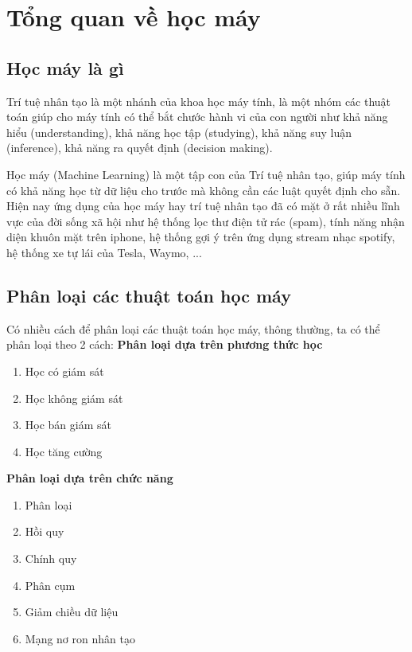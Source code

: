 \documentclass[../DoAn.tex]{subfiles}
\begin{document}
\section{Tổng quan về học máy}
\label{section:3.1}
\subsection{Học máy là gì}
Trí tuệ nhân tạo là một nhánh của khoa học máy tính, là một nhóm các thuật toán giúp cho máy tính có thể bắt chước hành vi của con người như khả năng hiểu (understanding), khả năng học tập (studying), khả năng suy luận (inference), khả năng ra quyết định (decision making). 

Học máy (Machine Learning) là một tập con của Trí tuệ nhân tạo, giúp máy tính có khả năng học từ dữ liệu cho trước mà không cần các luật quyết định cho sẵn. Hiện nay ứng dụng của học máy hay trí tuệ nhân tạo đã có mặt ở rất nhiều lĩnh vực của đời sống xã hội như hệ thống lọc thư điện tử rác (spam), tính năng nhận diện khuôn mặt trên iphone, hệ thống gợi ý trên ứng dụng stream nhạc spotify, hệ thống xe tự lái của Tesla, Waymo, ...
\subsection{Phân loại các thuật toán học máy}
Có nhiều cách để phân loại các thuật toán học máy, thông thường, ta có thể phân loại theo 2 cách:
\textbf{Phân loại dựa trên phương thức học}
\begin{enumerate}
    \item Học có giám sát
    \item Học không giám sát
    \item Học bán giám sát
    \item Học tăng cường
\end{enumerate}

\textbf{Phân loại dựa trên chức năng}
\begin{enumerate}
    \item Phân loại
    \item Hồi quy
    \item Chính quy
    \item Phân cụm
    \item Giảm chiều dữ liệu
    \item Mạng nơ ron nhân tạo
\end{enumerate}
\end{document}
